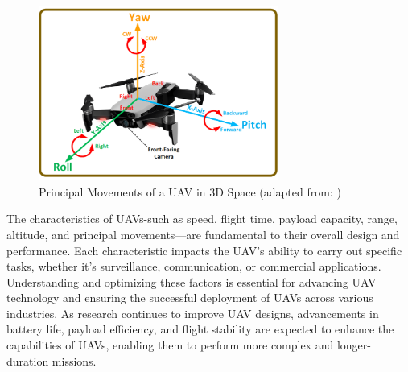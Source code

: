 

    \begin{figure}[H]  %
        \centering
        \includegraphics[width=0.7\textwidth]{Figures/Chapter1/Section2/1.png} 
        \caption{  Principal Movements of a UAV in 3D Space (adapted from: \cite{almahamid2024viznav})}
        \label{fig:method3_architecture} %
    \end{figure}



\vspace{0.5cm}

The characteristics of UAVs-such as speed, flight time, payload capacity, range, altitude, and principal movements—are fundamental to their overall design and performance. Each characteristic impacts the UAV's ability to carry out specific tasks, whether it's surveillance, communication, or commercial applications. Understanding and optimizing these factors is essential for advancing UAV technology and ensuring the successful deployment of UAVs across various industries. As research continues to improve UAV designs, advancements in battery life, payload efficiency, and flight stability are expected to enhance the capabilities of UAVs, enabling them to perform more complex and longer-duration missions.


